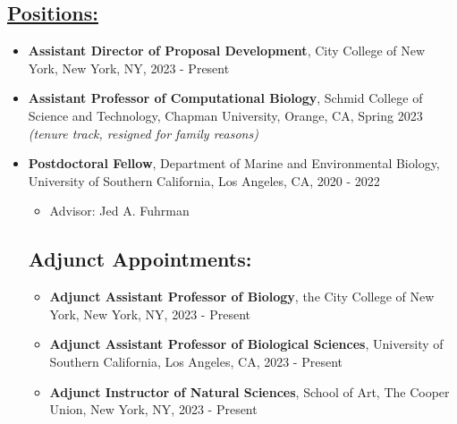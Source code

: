 \documentclass[]{res}
\begin{document}
 
 \small
{} %
 
 

\address{{\bf pronouns:} they/them/theirs {\emph{or}} she/her/hers\\ {\bf email:} jw4336@terpmail.umd.edu}
\address{{\bf website:} https://microbialgamut.com/\\ {\bf twitter:} @jlw\_ecoevo}

 
\begin{resume} 
 

 \section{\underline{Positions:}} %
\begin{itemize}[leftmargin=*]
\setlength\itemsep{0.5em}

\item[] {\bf Assistant Director of Proposal Development}, City College of New York, New York, NY, 2023 - Present
\item[] {\bf Assistant Professor of Computational Biology}, Schmid College of Science and Technology, Chapman University, Orange, CA, Spring 2023 \emph{(tenure track, resigned for family reasons)}
\item[] {\bf Postdoctoral Fellow}, Department of Marine and Environmental Biology, University of Southern California, Los Angeles, CA, 2020 - 2022
 \begin{itemize}
\item[] Advisor: Jed A. Fuhrman
\end{itemize}

 \section{Adjunct Appointments:}
\begin{itemize}[leftmargin=*]
\setlength\itemsep{0.5em}
\item[] {\bf Adjunct Assistant Professor of Biology}, the City College of New York, New York, NY, 2023 - Present
\item[] {\bf Adjunct Assistant Professor of Biological Sciences}, University of Southern California, Los Angeles, CA, 2023 - Present
\item[] {\bf Adjunct Instructor of Natural Sciences}, School of Art, The Cooper Union, New York, NY, 2023 - Present
\end{itemize}


\end{itemize}
\end{resume}
\end{document}
